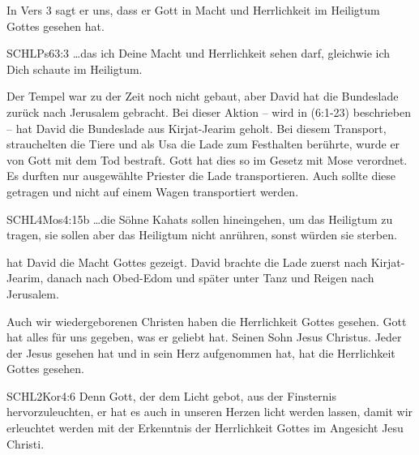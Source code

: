 \documentclass[14pt]{../../inc/mybib}
\begin{document}
    \begin{block}
        In Vers 3 sagt er uns, dass er Gott in Macht und Herrlichkeit im Heiligtum Gottes gesehen hat.
        \begin{bibelbox}{SCHL}{Ps}{63:3}
            \dots das ich Deine Macht und Herrlichkeit sehen darf, gleichwie ich Dich schaute im Heiligtum.
        \end{bibelbox}
        Der Tempel war zu der Zeit noch nicht gebaut, aber David hat die Bundeslade zurück nach Jerusalem gebracht. Bei dieser Aktion -- wird in (6:1-23) beschrieben -- hat David die Bundeslade aus Kirjat-Jearim geholt. Bei diesem Transport, strauchelten die Tiere und als Usa die Lade zum Festhalten berührte, wurde er von Gott mit dem Tod bestraft. Gott hat dies so im Gesetz mit Mose verordnet. Es durften nur ausgewählte Priester die Lade transportieren. Auch sollte diese getragen und nicht auf einem Wagen transportiert werden.
        \begin{bibelbox}{SCHL}{4Mos}{4:15b}
            \dots die Söhne Kahats sollen hineingehen, um das Heiligtum zu tragen, sie sollen aber das Heiligtum nicht anrühren, sonst würden sie sterben.
        \end{bibelbox}
         hat David die Macht Gottes gezeigt. David brachte die Lade zuerst nach Kirjat-Jearim, danach nach Obed-Edom und später unter Tanz und Reigen nach Jerusalem.
    \end{block}

    \begin{block}
        Auch wir wiedergeborenen Christen haben die Herrlichkeit Gottes gesehen. Gott hat alles für uns gegeben, was er geliebt hat. Seinen Sohn Jesus Christus. Jeder der Jesus gesehen hat und in sein Herz aufgenommen hat, hat die Herrlichkeit Gottes gesehen.
        \begin{bibelbox}{SCHL}{2Kor}{4:6}
            Denn Gott, der dem Licht gebot, aus der Finsternis hervorzuleuchten, er hat es auch in unseren Herzen licht werden lassen, damit wir erleuchtet werden mit der Erkenntnis der Herrlichkeit Gottes im Angesicht Jesu Christi.
        \end{bibelbox}
    \end{block}
\end{document}
